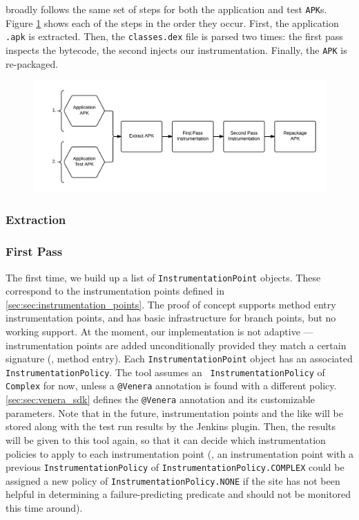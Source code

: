 \venera broadly follows the same set of steps for both the application and
test {\tt APK}s. Figure \ref{fig:instrumenting_apk} shows each of the steps in
the order they occur. First, the application {\tt .apk} is extracted. Then, the
{\tt classes.dex} file is parsed two times: the first pass inspects the
bytecode, the second injects our instrumentation. Finally, the {\tt APK} is
re-packaged.

\begin{figure}[h]
\includegraphics[width=\linewidth]{Images/instrumenting_apk}
\caption{}
\label{fig:instrumenting_apk}
\end{figure}

\subsubsection{Extraction}

\subsubsection{First Pass}

The first time, we build up a list of {\tt InstrumentationPoint} objects. These
correspond to the instrumentation points defined in
\autoref{sec:sec:instrumentation_points}. The proof of concept supports method
entry instrumentation points, and has basic infrastructure for branch points,
but no working support. At the moment, our implementation is not adaptive ---
instrumentation points are added unconditionally provided they match a certain
signature (\eg, method entry). Each {\tt InstrumentationPoint} object has an
associated {\tt InstrumentationPolicy}. The tool assumes an {\tt
InstrumentationPolicy} of {\tt Complex} for now, unless a {\tt @Venera}
annotation is found with a different policy. \autoref{sec:sec:venera_sdk}
defines the {\tt @Venera} annotation and its customizable parameters. Note
that in the future, instrumentation points and the like will be stored along
with the test run results by the Jenkins plugin. Then, the results will be given
to this tool again, so that it can decide which instrumentation policies to
apply to each instrumentation point (\eg, an instrumentation point with a
previous {\tt InstrumentationPolicy} of {\tt InstrumentationPolicy.COMPLEX}
could be assigned a new policy of {\tt InstrumentationPolicy.NONE} if the site
has not been helpful in determining a failure-predicting predicate and should
not be monitored this time around).

